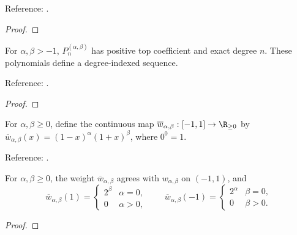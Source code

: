 \begin{supporting}
\begin{theorem}
Reference: \cite[18.2(i)]{dlmf}.
\end{theorem}
\begin{proof}
\leanok
\end{proof}

\begin{theorem}
\label{thm:jacobi-sequence}
\leanok
For $\alpha,\beta>-1$, $P_n^{(\alpha,\beta)}$ has positive top coefficient and exact degree $n$. These polynomials define a degree-indexed sequence.

Reference: \cite[Table 18.3.1]{dlmf}.
\end{theorem}
\begin{proof}
\leanok
\end{proof}

\begin{definition}
\label{def:jacobi-weight-closed}
\leanok
For $\alpha,\beta\ge0$, define the continuous map
$\overline w_{\alpha,\beta}:[-1,1]\to\R_{\ge0}$ by
$\overline w_{\alpha,\beta}(x)=(1-x)^\alpha(1+x)^\beta$, where $0^0=1$.

Reference: \cite[Table 18.3.1]{dlmf}.
\end{definition}

\begin{theorem}
\label{thm:jacobi-weight-closed}
\leanok
For $\alpha,\beta\ge0$, the weight $\overline w_{\alpha,\beta}$ agrees with
$w_{\alpha,\beta}$ on $(-1,1)$, and
\[\overline w_{\alpha,\beta}(1)=\begin{cases}2^\beta&\alpha=0,\\0&\alpha>0,\end{cases}
\qquad
\overline w_{\alpha,\beta}(-1)=\begin{cases}2^\alpha&\beta=0,\\0&\beta>0.\end{cases}\]
\end{theorem}
\begin{proof}
\leanok
\end{proof}


\end{supporting}
